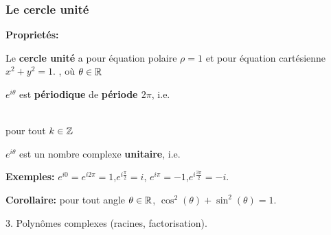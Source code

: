 \begin{frame}
\frametitle{\bf Le cercle unité} 
\medskip 

\begin{center}
\end{center}
{\bf Propriet\'es:} 
\begin{itemize}

\bitem 
Le {\bf cercle unité} a pour équation polaire $\rho=1$ et pour équation cartésienne $x^2+y^2=1$.
\bitem
{}, où $\theta\in\mathbb R$ 
\bitem 
\parbox[t]{5.5cm}{
$e^{i\theta}$ est {\bf p\'eriodique} de {\bf p\'eriode $2\pi$}, i.e.}
\quad  
\parbox[t]{3cm}{
 \vspace*{1mm} \\ 
\quad pour tout $k\in\mathbb Z$}
\vspace*{2mm}

\pause
\bitem 
$e^{i\theta}$ est un nombre complexe {\bf unitaire}, i.e.\ 
\vspace*{2mm}
 
\end{itemize}

{\small
{\bf Exemples:}\quad 
$e^{i 0}=e^{i 2\pi}=1$,\quad $e^{i \frac{\pi}{2}}=i$,\quad 
$e^{i \pi}=-1$,\quad $e^{i \frac{3\pi}{2}}=-i$. }
\vspace*{3mm}

{\bf Corollaire:} pour tout angle $\theta\in\mathbb R$, $\boxed{\cos^2(\theta) + \sin^2(\theta) = 1.}$ 

\end{frame}

\begin{frame}
\begin{center}
3. Polynômes complexes (racines, factorisation). 
\end{center}
\end{frame}

